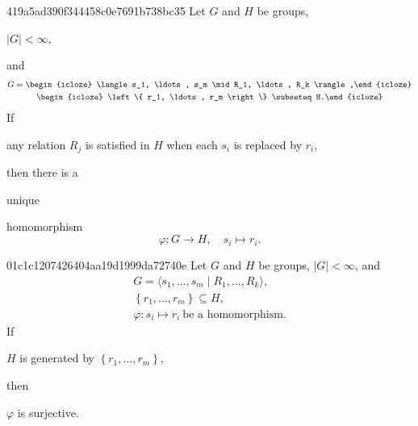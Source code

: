 \begin{note}{419a5ad390f344458c0e7691b738bc35}
    Let \({ G }\) and \({ H }\) be groups, \begin{icloze}{6}\({ \left\lvert G \right\rvert < \infty }\),\end{icloze} and
    \[
        \begin{gathered}
            G = \begin{icloze}{3}\langle s_1, \ldots, s_m \mid R_1, \ldots, R_k \rangle,\end{icloze} \\
            \begin{icloze}{4}\left\{ r_1, \ldots, r_m \right\} \subseteq H.\end{icloze}
        \end{gathered}
    \]
    If \begin{icloze}{1}any relation \({ R_j }\) is satisfied in \({ H }\) when each \({ s_i }\) is replaced by \({ r_i }\),\end{icloze} then there is a \begin{icloze}{5}unique\end{icloze}
    \begin{icloze}{2}
        homomorphism
        \[
            \varphi : G \to H, \quad s_i \mapsto r_i.
        \]
    \end{icloze}
\end{note}

\begin{note}{01c1c1207426404aa19d1999da72740e}
    Let \({ G }\) and \({ H }\) be groups, \({ \left\lvert G \right\rvert < \infty }\), and
    \[
        \begin{gathered}
            G = \langle s_1, \ldots, s_m \mid R_1, \ldots, R_k \rangle, \\
            \left\{ r_1, \ldots, r_m \right\} \subseteq H, \\
            \varphi : s_i \mapsto r_i\ \text{be a homomorphism}.
        \end{gathered}
    \]
    If \begin{icloze}{2}\({ H }\) is generated by \({ \left\{ r_1, \ldots, r_m \right\} }\),\end{icloze} then \begin{icloze}{1}\({ \varphi }\) is surjective.\end{icloze}
\end{note}


